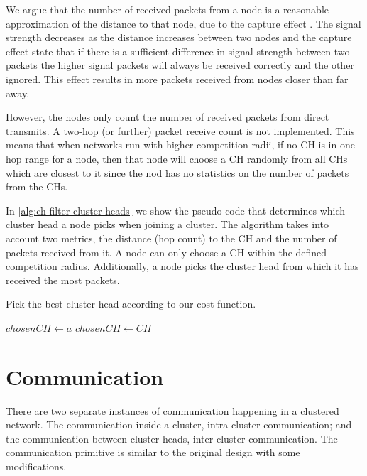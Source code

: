 We argue that the number of received packets from a node is a reasonable approximation of the distance to that node, due to the capture effect \cite{Lee2007-capture-effect}. The signal strength decreases as the distance increases between two nodes and the capture effect state that if there is a sufficient difference in signal strength between two packets the higher signal packets will always be received correctly and the other ignored. This effect results in more packets received from nodes closer than far away.

However, the nodes only count the number of received packets from direct transmits. A two-hop (or further) packet receive count is not implemented. This means that when networks run with higher competition radii, if no CH is in one-hop range for a node, then that node will choose a CH randomly from all CHs which are closest to it since the nod has no statistics on the number of packets from the CHs.

In \cref{alg:ch-filter-cluster-heads} we show the pseudo code that determines which cluster head a node picks when joining a cluster. The algorithm takes into account two metrics, the distance (hop count) to the CH and the number of packets received from it. A node can only choose a CH within the defined competition radius. Additionally, a node picks the cluster head from which it has received the most packets.

\begin{algorithm}
\caption{Pick the best cluster head according to our cost function.}
\label{alg:ch-filter-cluster-heads}
\begin{algorithmic}[1]
    \State $chosenCH \gets a$
                \State $chosenCH \gets CH$
            \EndIf
        \EndIf
    \EndFor
\EndProcedure
\end{algorithmic}
\end{algorithm}

\section{Communication}
There are two separate instances of communication happening in a clustered network. The communication inside a cluster, intra-cluster communication; and the communication between cluster heads, inter-cluster communication. The communication primitive is similar to the original \atwo{} design with some modifications.



